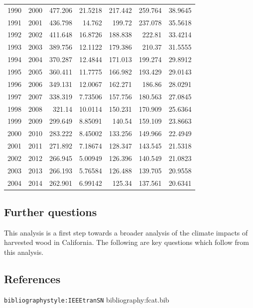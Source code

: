 \documentclass[a4paper]{article}
\begin{document}
\begin{longtable}{rrrrrrr}
1990 & 2000 & 477.206 & 21.5218 & 217.442 & 259.764 & 38.9645\\
1991 & 2001 & 436.798 & 14.762 & 199.72 & 237.078 & 35.5618\\
1992 & 2002 & 411.648 & 16.8726 & 188.838 & 222.81 & 33.4214\\
1993 & 2003 & 389.756 & 12.1122 & 179.386 & 210.37 & 31.5555\\
1994 & 2004 & 370.287 & 12.4844 & 171.013 & 199.274 & 29.8912\\
1995 & 2005 & 360.411 & 11.7775 & 166.982 & 193.429 & 29.0143\\
1996 & 2006 & 349.131 & 12.0067 & 162.271 & 186.86 & 28.0291\\
1997 & 2007 & 338.319 & 7.73506 & 157.756 & 180.563 & 27.0845\\
1998 & 2008 & 321.14 & 10.0114 & 150.231 & 170.909 & 25.6364\\
1999 & 2009 & 299.649 & 8.85091 & 140.54 & 159.109 & 23.8663\\
2000 & 2010 & 283.222 & 8.45002 & 133.256 & 149.966 & 22.4949\\
2001 & 2011 & 271.892 & 7.18674 & 128.347 & 143.545 & 21.5318\\
2002 & 2012 & 266.945 & 5.00949 & 126.396 & 140.549 & 21.0823\\
2003 & 2013 & 266.193 & 5.76584 & 126.488 & 139.705 & 20.9558\\
2004 & 2014 & 262.901 & 6.99142 & 125.34 & 137.561 & 20.6341\\
\end{longtable}



\subsection{Further questions}
\label{sec-1-4}

This analysis is a first step towards a broader analysis of the
climate impacts of harvested wood in California. The following are key
questions which follow from this analysis.


\subsection{References}
\label{sec-1-5}
\texttt{bibliographystyle:IEEEtranSN}
bibliography:fcat.bib
\end{document}
